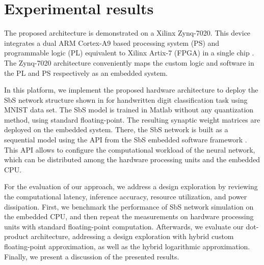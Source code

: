 \section{Experimental results}
\label{sec:experimental_results}
The proposed architecture is demonstrated on a Xilinx Zynq-7020. This device integrates a dual ARM Cortex-A9 based processing system (PS) and programmable logic (PL) equivalent to Xilinx Artix-7 (FPGA) in a single chip \cite{xilinx2015zynq}. The Zynq-7020 architecture conveniently maps the custom logic and software in the PL and PS respectively as an embedded system.

In this platform, we implement the proposed hardware architecture to deploy the SbS network structure shown in  for handwritten digit classification task using MNIST data set. The SbS model is trained in Matlab without any quantization method, using standard floating-point. The resulting synaptic weight matrices are deployed on the embedded system. There, the SbS network is built as a sequential model using the API from the SbS embedded software framework \cite{nevarez2020accelerator}. This API allows to configure the computational workload of the neural network, which can be distributed among the hardware processing units and the embedded CPU.

For the evaluation of our approach, we address a design exploration by reviewing the computational latency, inference accuracy, resource utilization, and power dissipation. First, we benchmark the performance of SbS network simulation on the embedded CPU, and then repeat the measurements on hardware processing units with standard floating-point computation. Afterwards, we evaluate our dot-product architecture, addressing a design exploration with hybrid custom floating-point approximation, as well as the hybrid logarithmic approximation. Finally, we present a discussion of the presented results.

